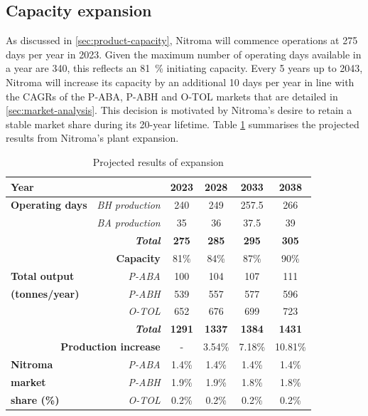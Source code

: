 \subsection{Capacity expansion}
\label{sec:expansion}
As discussed in \cref{sec:product-capacity}, Nitroma will commence operations at 275 days per year in 2023. Given the maximum number of operating days available in a year are 340, this reflects an \SI{81}{\percent} initiating capacity. Every 5 years up to 2043, Nitroma will increase its capacity by an additional 10 days per year in line with the CAGRs of the P-ABA, P-ABH and O-TOL markets that are detailed in \cref{sec:market-analysis}.  This decision is motivated by Nitroma’s desire to retain a stable market share during its 20-year lifetime. Table \ref{tab:Expansion} summarises the projected results from Nitroma’s plant expansion.

\begin{table}[H]
\centering
\caption{Projected results of expansion}
\label{tab:Expansion}
\begin{tabular}{lr|cccc}
\toprule
\multicolumn{2}{l|}{\textbf{Year}}                & \textbf{2023} & \textbf{2028} & \textbf{2033} & \textbf{2038} \\\midrule
\textbf{Operating days} & \textit{BH production}  & 240           & 249           & 257.5         & 266           \\
\textbf{}               & \textit{BA production}  & 35            & 36            & 37.5          & 39            \\
\textbf{}               & \textit{\textbf{Total}} & \textbf{275}  & \textbf{285}  & \textbf{295}  & \textbf{305}  \\
\multicolumn{2}{r|}{\textbf{Capacity}}            & 81\%          & 84\%          & 87\%          & 90\%          \\\midrule
\textbf{Total output}   & \textit{P-ABA}          & 100           & 104           & 107           & 111           \\
\textbf{(tonnes/year)}  & \textit{P-ABH} & 539  & 557  & 577           & 596           \\
\textbf{}               & \textit{O-TOL}          & 652           & 676           & 699           & 723           \\
\textbf{}               & \textit{\textbf{Total}} & \textbf{1291} & \textbf{1337} & \textbf{1384} & \textbf{1431} \\
\multicolumn{2}{r|}{\textbf{Production increase}} & -             & 3.54\%        & 7.18\%        & 10.81\%       \\\midrule
\textbf{Nitroma}        & \textit{P-ABA}          & 1.4\%         & 1.4\%         & 1.4\%         & 1.4\%         \\
\textbf{market}         & \textit{P-ABH}          & 1.9\%         & 1.9\%         & 1.8\%         & 1.8\%         \\
\textbf{share (\%)}     & \textit{O-TOL}          & 0.2\%         & 0.2\%         & 0.2\%         & 0.2\%        \\\bottomrule
\end{tabular}
\end{table}


